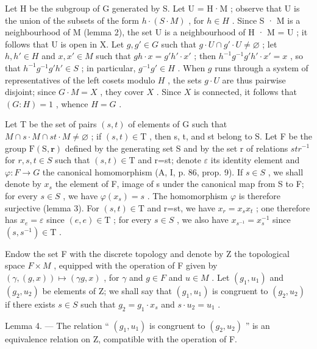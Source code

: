 Let H be the subgroup of G generated by S. Let U = H·M ; observe that U is the union of the subsets of the form \(h \cdot (S \cdot M)\) , for \(h \in H\) . Since S · M is a neighbourhood of M (lemma 2), the set U is a neighbourhood of H · M = U ; it follows that U is open in X. Let \(g, g' \in G\) such that \(g \cdot U \cap g' \cdot U \neq \varnothing\) ; let \(h, h' \in H\) and \(x, x' \in M\) such that \(gh \cdot x = g'h' \cdot x'\) ; then \(h^{-1}g^{-1}g'h' \cdot x' = x\) , so that \(h^{-1}g^{-1}g'h' \in S\) ; in particular, \(g^{-1}g' \in H\) . When \(g\) runs through a system of representatives of the left cosets modulo \(H\) , the sets \(g \cdot U\) are thus pairwise disjoint; since \(G \cdot M = X\) , they cover \(X\) . Since \(X\) is connected, it follows that \((G : H) = 1\) , whence \(H = G\) .

Let T be the set of pairs \((s,t)\) of elements of G such that \(M\cap s\cdot M\cap st\cdot M\neq\varnothing\) ; if \((s,t)\in\mathrm{T}\) , then s, t, and st belong to S. Let F be the group \(\mathrm{F}(\mathrm{S},\mathbf{r})\) defined by the generating set S and by the set r of relations \(str^{-1}\) for \(r,s,t\in S\) such that \((s,t)\in\mathrm{T}\) and r=st; denote \(\varepsilon\) its identity element and \(\varphi\colon F\to G\) the canonical homomorphism (A, I, p. 86, prop. 9). If \(s\in S\) , we shall denote by \(x_{s}\) the element of F, image of s under the canonical map from S to F; for every \(s\in S\) , we have \(\varphi(x_{s})=s\) . The homomorphism \(\varphi\) is therefore surjective (lemma 3). For \((s,t)\in\mathrm{T}\) and r=st, we have \(x_{r}=x_{s}x_{t}\) ; one therefore has \(x_{e}=\varepsilon\) since \((e,e)\in\mathrm{T}\) ; for every \(s\in S\) , we also have \(x_{s^{-1}}=x_{s}^{-1}\) since \((s,s^{-1})\in\mathrm{T}\) .

Endow the set F with the discrete topology and denote by Z the topological space \(F \times M\) , equipped with the operation of F given by \((\gamma, (g, x)) \mapsto (\gamma g, x)\) , for \(\gamma\) and \(g \in F\) and \(u \in M\) . Let \((g_{1}, u_{1})\) and \((g_{2}, u_{2})\) be elements of Z; we shall say that \((g_{1}, u_{1})\) is congruent to \((g_{2}, u_{2})\) if there exists \(s \in S\) such that \(g_{2} = g_{1} \cdot x_{s}\) and \(s \cdot u_{2} = u_{1}\) .

Lemma 4. --- The relation “ \((g_{1}, u_{1})\) is congruent to \((g_{2}, u_{2})\) ” is an equivalence relation on Z, compatible with the operation of F.

